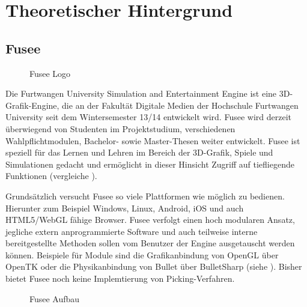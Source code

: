 \section{Theoretischer Hintergrund}

\subsection{Fusee}

\begin{figure}[htbp]
  \centering
  \caption{Fusee Logo}
  \label{fig:FuseeLogo}
\end{figure}

Die Furtwangen University Simulation and Entertainment Engine ist eine 3D-Grafik-Engine, die an der Fakultät Digitale Medien der Hochschule Furtwangen University seit dem Wintersemester 13/14 entwickelt wird. Fusee wird derzeit überwiegend von Studenten im Projektstudium, verschiedenen Wahlpflichtmodulen, Bachelor- sowie Master-Thesen weiter entwickelt. Fusee ist speziell für das Lernen und Lehren im Bereich der 3D-Grafik, Spiele und Simulationen gedacht und ermöglicht in dieser Hinsicht Zugriff auf tiefliegende Funktionen (vergleiche \cite{Muller.2014}).

Grundsätzlich versucht Fusee so viele Plattformen wie möglich zu bedienen. Hierunter zum Beispiel Windows, Linux, Android, iOS und auch HTML5/WebGL fähige Browser. Fusee verfolgt einen hoch modularen Ansatz, jegliche extern anprogrammierte Software und auch teilweise interne bereitgestellte Methoden sollen vom Benutzer der Engine ausgetauscht werden können. Beispiele für Module sind die Grafikanbindung von OpenGL über OpenTK oder die Physikanbindung von Bullet über BulletSharp (siehe \cite{Schey.2014}). Bisher bietet Fusee noch keine Implemtierung von Picking-Verfahren.

\begin{figure}[ht!]
  \centering
  \caption{Fusee Aufbau}
  \label{fig:FuseeAufbau}
\end{figure}

